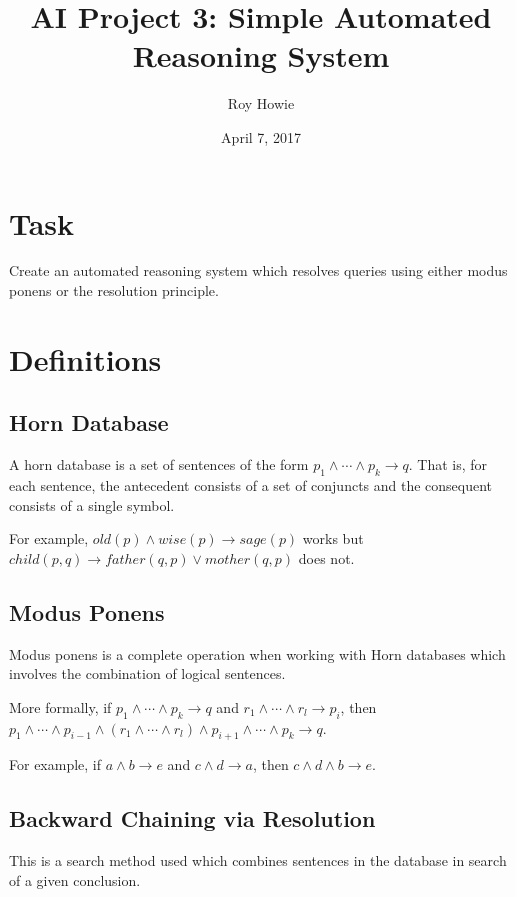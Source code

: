 \documentclass{article}
\begin{document}
\title{\vspace{-1cm}AI Project 3: Simple Automated Reasoning System}
\author{Roy Howie}
\date{April 7, 2017}
\maketitle

\section{Task}
  Create an automated reasoning system which resolves queries using either modus
  ponens or the resolution principle.

\section{Definitions}
  \subsection{Horn Database}
    A horn database is a set of sentences of the form $p_1\wedge\cdots\wedge p_k
    \rightarrow q$. That is, for each sentence, the antecedent consists of a set
    of conjuncts and the consequent consists of a single symbol.

    For example, $old(p)\wedge wise(p)\rightarrow sage(p)$ works but $child(p,q)
    \rightarrow father(q,p)\vee mother(q,p)$ does not.

  \subsection{Modus Ponens}
    Modus ponens is a complete operation when working with Horn databases which
    involves the combination of logical sentences.

    More formally, if $p_1\wedge\cdots\wedge p_k\rightarrow q$ and $r_1\wedge
    \cdots\wedge r_l\rightarrow p_i$, then $p_1\wedge\cdots\wedge p_{i-1}\wedge
    (r_1\wedge\cdots\wedge r_l)\wedge p_{i+1}\wedge\cdots\wedge p_k\rightarrow
    q$.

    For example, if $a\wedge b\rightarrow e$ and $c\wedge d\rightarrow a$,
    then $c\wedge d\wedge b\rightarrow e$.

  \subsection{Backward Chaining via Resolution}
    This is a search method used which combines sentences in the database in
    search of a given conclusion.
\end{document}
